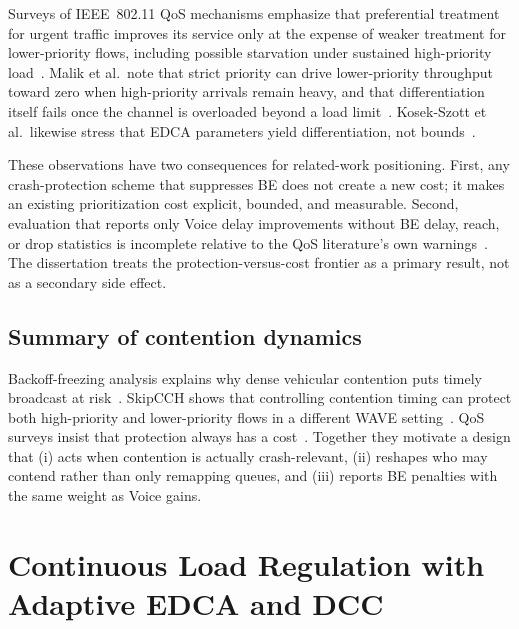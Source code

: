 Surveys of IEEE~802.11 QoS mechanisms emphasize that preferential treatment for urgent traffic improves its service only at the expense of weaker treatment for lower-priority flows, including possible starvation under sustained high-priority load~\cite{Evolution_QoS_Mechanisms,kosekszott2012What}.
Malik et al.\ note that strict priority can drive lower-priority throughput toward zero when high-priority arrivals remain heavy, and that differentiation itself fails once the channel is overloaded beyond a load limit~\cite{Evolution_QoS_Mechanisms}.
Kosek-Szott et al.\ likewise stress that EDCA parameters yield differentiation, not bounds~\cite{kosekszott2012What}.

These observations have two consequences for related-work positioning.
First, any crash-protection scheme that suppresses BE does not create a new cost; it makes an existing prioritization cost explicit, bounded, and measurable.
Second, evaluation that reports only Voice delay improvements without BE delay, reach, or drop statistics is incomplete relative to the QoS literature's own warnings~\cite{Evolution_QoS_Mechanisms}.
The dissertation treats the protection-versus-cost frontier as a primary result, not as a secondary side effect.

\subsection{Summary of contention dynamics}
\label{sec:rw:dynamics-synth}

Backoff-freezing analysis explains why dense vehicular contention puts timely broadcast at risk~\cite{Continuous_Backoff_Freezing_Li}.
SkipCCH shows that controlling contention timing can protect both high-priority and lower-priority flows in a different WAVE setting~\cite{SkipCCH_Garrido}.
QoS surveys insist that protection always has a cost~\cite{Evolution_QoS_Mechanisms,kosekszott2012What}.
Together they motivate a design that (i) acts when contention is actually crash-relevant, (ii) reshapes who may contend rather than only remapping queues, and (iii) reports BE penalties with the same weight as Voice gains.

\section{Continuous Load Regulation with Adaptive EDCA and DCC}
\label{sec:rw:alwayson}

